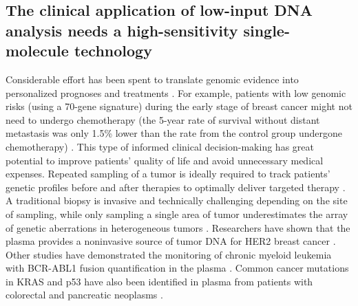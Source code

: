 \subsection{The clinical application of low-input DNA analysis needs a high-sensitivity single-molecule technology}
Considerable effort has been spent to translate genomic evidence into personalized prognoses and treatments \cite{Cardoso:2016dt,Papaemmanuil:2016jz,Girirajan:2012ks}. For example, patients with low genomic risks (using a 70-gene signature) during the early stage of breast cancer might not need to undergo chemotherapy (the 5-year rate of survival without distant metastasis was only 1.5\% lower than the rate from the control group undergone chemotherapy) \cite{Cardoso:2016dt}. This type of informed clinical decision-making has great potential to improve patients' quality of life and avoid unnecessary medical expenses. Repeated sampling of a tumor is ideally required to track patients' genetic profiles before and after therapies to optimally deliver targeted therapy \cite{Gevensleben:2013kg}. A traditional biopsy is invasive and technically challenging depending on the site of sampling, while only sampling a single area of tumor underestimates the array of genetic aberrations in heterogeneous tumors \cite{Ding:2010hu}. Researchers have shown that the plasma provides a noninvasive source of tumor DNA for HER2 breast cancer \cite{Gevensleben:2013kg,Cochran:2014cn}. Other studies have demonstrated the monitoring of chronic myeloid leukemia with BCR-ABL1 fusion quantification in the plasma \cite{Jennings:2014et}. Common cancer mutations in KRAS and p53 have also been identified in plasma from patients with colorectal and pancreatic neoplasms \cite{Anker:1997ub,Mulcahy:1998wa}. 

